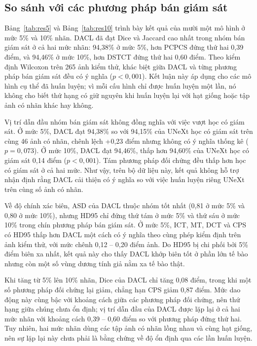\documentclass{IEEEtran}
\begin{document}




\subsection{So sánh với các phương pháp bán giám sát}

Bảng~\ref{tab:res5} và Bảng~\ref{tab:res10} trình bày kết quả của mười một mô hình ở mức 5\% và 10\% nhãn. DACL đã đạt Dice và Jaccard cao nhất trong nhóm bán giám sát ở cả hai mức nhãn: 94,38\% ở mức 5\%, hơn PCPCS đứng thứ hai 0,39 điểm, và 94,46\% ở mức 10\%, hơn DSTCT đứng thứ hai 0,60 điểm. Theo kiểm định Wilcoxon trên 265 ảnh kiểm thử, khác biệt giữa DACL và từng phương pháp bán giám sát đều có ý nghĩa ($p<0{,}001$). Kết luận này áp dụng cho các mô hình cụ thể đã huấn luyện; vì mỗi cấu hình chỉ được huấn luyện một lần, nó không cho biết thứ hạng có giữ nguyên khi huấn luyện lại với hạt giống hoặc tập ảnh có nhãn khác hay không.

Vị trí dẫn đầu nhóm bán giám sát không đồng nghĩa với việc vượt học có giám sát. Ở mức 5\%, DACL đạt 94,38\% so với 94,15\% của UNeXt học có giám sát trên cùng 46 ảnh có nhãn, chênh lệch +0,23 điểm nhưng không có ý nghĩa thống kê ($p=0{,}073$). Ở mức 10\%, DACL đạt 94,46\%, thấp hơn 94,60\% của UNeXt học có giám sát 0,14 điểm ($p<0{,}001$). Tám phương pháp đối chứng đều thấp hơn học có giám sát ở cả hai mức. Như vậy, trên bộ dữ liệu này, kết quả không hỗ trợ nhận định rằng DACL cải thiện có ý nghĩa so với việc huấn luyện riêng UNeXt trên cùng số ảnh có nhãn.

Về độ chính xác biên, ASD của DACL thuộc nhóm tốt nhất (0,81 ở mức 5\% và 0,80 ở mức 10\%), nhưng HD95 chỉ đứng thứ tám ở mức 5\% và thứ sáu ở mức 10\% trong chín phương pháp bán giám sát. Ở mức 5\%, ICT, MT, DCT và CPS có HD95 thấp hơn DACL một cách có ý nghĩa theo cùng phép kiểm định trên ảnh kiểm thử, với mức chênh 0,12 -- 0,20 điểm ảnh. Do HD95 bị chi phối bởi 5\% điểm biên xa nhất, kết quả này cho thấy DACL khớp biên tốt ở phần lớn tế bào nhưng còn một số vùng dương tính giả nằm xa tế bào thật.

Khi tăng từ 5\% lên 10\% nhãn, Dice của DACL chỉ tăng 0,08 điểm, trong khi một số phương pháp đối chứng lại giảm, chẳng hạn CPS giảm 0,87 điểm. Mức dao động này cùng bậc với khoảng cách giữa các phương pháp đối chứng, nên thứ hạng giữa chúng chưa ổn định; vị trí dẫn đầu của DACL được lặp lại ở cả hai mức nhãn với khoảng cách 0,39 -- 0,60 điểm so với phương pháp đứng thứ hai. Tuy nhiên, hai mức nhãn dùng các tập ảnh có nhãn lồng nhau và cùng hạt giống, nên sự lặp lại này chưa phải là bằng chứng về độ ổn định qua các lần huấn luyện.
\end{document}
